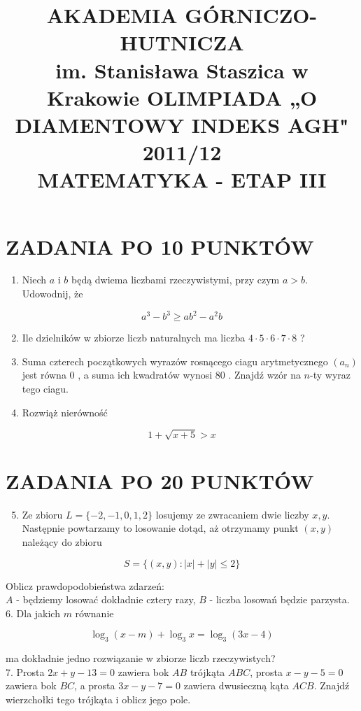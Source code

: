 \documentclass[10pt]{article}
\title{AKADEMIA GÓRNICZO-HUTNICZA \\
 im. Stanisława Staszica w Krakowie OLIMPIADA „O DIAMENTOWY INDEKS AGH" 2011/12 \\
 MATEMATYKA - ETAP III }
\author{}
\date{}
\begin{document}
\maketitle
\section*{ZADANIA PO 10 PUNKTÓW}
\begin{enumerate}
  \item Niech $a$ i $b$ będą dwiema liczbami rzeczywistymi, przy czym $a>b$. Udowodnij, że
\end{enumerate}

$$
a^{3}-b^{3} \geq a b^{2}-a^{2} b
$$

\begin{enumerate}
  \setcounter{enumi}{1}
  \item Ile dzielników w zbiorze liczb naturalnych ma liczba $4 \cdot 5 \cdot 6 \cdot 7 \cdot 8$ ?
  \item Suma czterech początkowych wyrazów rosnącego ciagu arytmetycznego $\left(a_{n}\right)$ jest równa 0 , a suma ich kwadratów wynosi 80 . Znajdź wzór na $n$-ty wyraz tego ciagu.
  \item Rozwiąż nierówność
\end{enumerate}

$$
1+\sqrt{x+5}>x
$$

\section*{ZADANIA PO 20 PUNKTÓW}
\begin{enumerate}
  \setcounter{enumi}{4}
  \item Ze zbioru $L=\{-2,-1,0,1,2\}$ losujemy ze zwracaniem dwie liczby $x, y$. Następnie powtarzamy to losowanie dotąd, aż otrzymamy punkt $(x, y)$ należący do zbioru
\end{enumerate}

$$
S=\{(x, y):|x|+|y| \leq 2\}
$$

Oblicz prawdopodobieństwa zdarzeń:\\
$A$ - będziemy losować dokładnie cztery razy, $B$ - liczba losowań będzie parzysta.\\
6. Dla jakich $m$ równanie

$$
\log _{3}(x-m)+\log _{3} x=\log _{3}(3 x-4)
$$

ma dokładnie jedno rozwiązanie w zbiorze liczb rzeczywistych?\\
7. Prosta $2 x+y-13=0$ zawiera bok $A B$ trójkąta $A B C$, prosta $x-y-5=0$ zawiera bok $B C$, a prosta $3 x-y-7=0$ zawiera dwusieczną kąta $A C B$. Znajdź wierzchołki tego trójkąta i oblicz jego pole.
\end{document}
